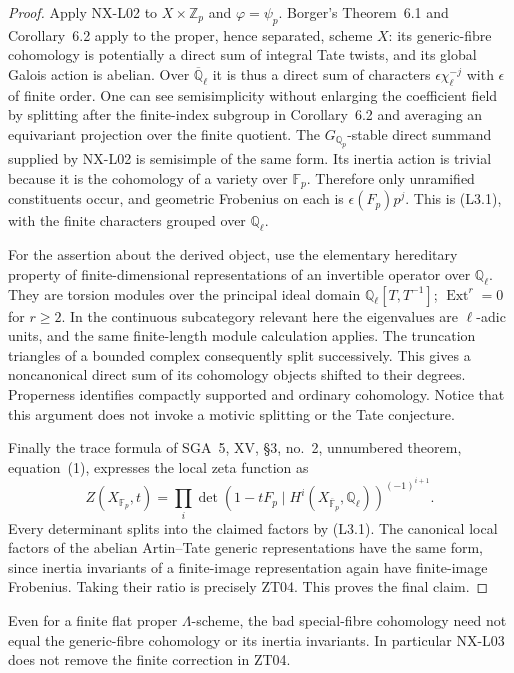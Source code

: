 \begin{proof}
Apply NX-L02 to $X\times\mathbb Z_p$ and $\varphi=\psi_p$.
Borger's Theorem~6.1 and Corollary~6.2 apply to the proper, hence
separated, scheme $X$: its generic-fibre cohomology is potentially
a direct sum of integral Tate twists, and its global Galois action
is abelian.  Over $\overline{\mathbb Q}_\ell$ it is thus a direct
sum of characters $\epsilon\chi_\ell^{-j}$ with $\epsilon$ of
finite order.  One can see semisimplicity without enlarging the
coefficient field by splitting after the finite-index subgroup in
Corollary~6.2 and averaging an equivariant projection over the finite
quotient.  The $G_{\mathbb Q_p}$-stable direct summand supplied by
NX-L02 is semisimple of the same form.  Its inertia action is trivial
because it is the cohomology of a variety over $\mathbb F_p$.
Therefore only unramified constituents occur, and geometric
Frobenius on each is $\epsilon(F_p)p^j$.  This is (L3.1), with the
finite characters grouped over $\mathbb Q_\ell$.

For the assertion about the derived object, use the elementary
hereditary property of finite-dimensional representations of an
invertible operator over $\mathbb Q_\ell$.  They are torsion modules
over the principal ideal domain $\mathbb Q_\ell[T,T^{-1}]$;
$\operatorname{Ext}^r=0$ for $r\geq2$.  In the continuous subcategory
relevant here the eigenvalues are $\ell$-adic units, and the same
finite-length module calculation applies.  The truncation triangles
of a bounded complex consequently split successively.  This gives
a noncanonical direct sum of its cohomology objects shifted to their
degrees.  Properness identifies compactly supported and ordinary
cohomology.  Notice that this argument does not invoke a motivic
splitting or the Tate conjecture.

Finally the trace formula of SGA~5, XV, \S3, no.~2, unnumbered theorem,
equation~(1), expresses the local zeta function as
\[
 Z(X_{\mathbb F_p},t)=
 \prod_i\det(1-tF_p\mid H^i(X_{\overline{\mathbb F}_p},\mathbb Q_\ell))^{(-1)^{i+1}}.
\]
Every determinant splits into the claimed factors by (L3.1).  The
canonical local factors of the abelian Artin--Tate generic
representations have the same form, since inertia invariants of a
finite-image representation again have finite-image Frobenius.
Taking their ratio is precisely ZT04.  This proves the final claim.
\end{proof}

\begin{proposition}
\label{NX-L04}
Even for a finite flat proper $\Lambda$-scheme, the bad special-fibre
cohomology need not equal the generic-fibre cohomology or its inertia
invariants.  In particular NX-L03 does not remove the finite
correction in ZT04.
\end{proposition}

